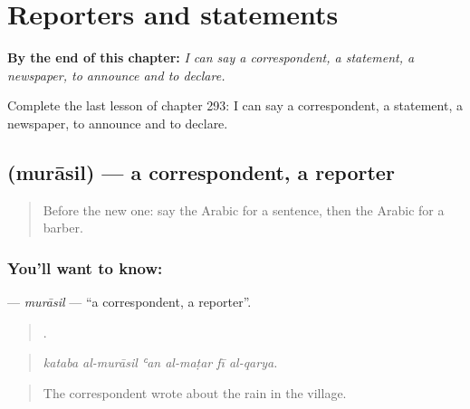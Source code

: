 
\chapter{Reporters and statements}
\label{ch:ar-reporters-and-statements}

\begin{chapteropening}
\textbf{By the end of this chapter:} \emph{I can say a correspondent, a statement, a newspaper, to announce and to declare.}

Complete the last lesson of chapter 293: I can say a correspondent, a statement, a newspaper, to announce and to declare.
\end{chapteropening}

\section[\texorpdfstring{\ar{مراسل} (murāsil)}{مراسل (murāsil)}]{ (murāsil) — a correspondent, a reporter}

\label{lesson:AR-C293-murasil}



\begin{quote}
Before the new one: say the Arabic for a sentence, then the Arabic for a barber.
\end{quote}

\subsection*{You'll want to know: }
\textbf{} — \emph{murāsil} — \textquotedblleft{}a correspondent, a reporter\textquotedblright{}.

\begin{quote}
     .
\end{quote}

\begin{quote}
\emph{kataba al-murāsil ʿan al-maṭar fī al-qarya.}
\end{quote}

\begin{quote}
The correspondent wrote about the rain in the village.
\end{quote}


